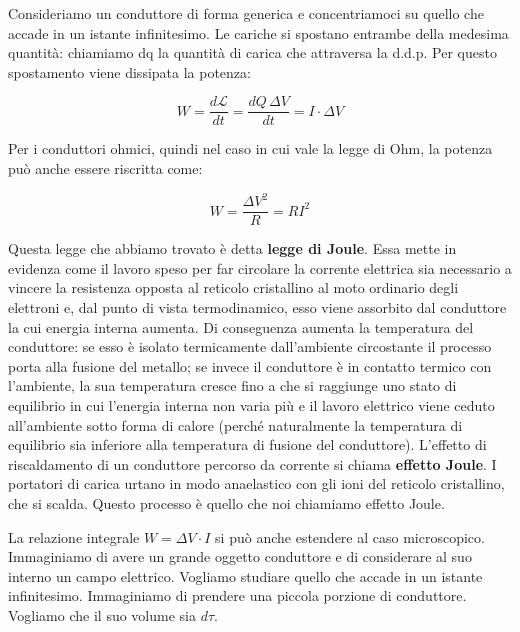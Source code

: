 Consideriamo un conduttore di forma generica e concentriamoci su quello che accade in un istante infinitesimo. Le cariche si spostano entrambe della medesima quantità: chiamiamo dq la quantità di carica che attraversa la d.d.p. Per questo spostamento viene dissipata la potenza:

\[
	\boxed{W=\frac{d\mathcal{L}}{dt} = \frac{dQ\,\Delta V}{dt} = I\cdot \Delta V}
\]

Per i conduttori ohmici, quindi nel caso in cui vale la legge di Ohm, la potenza può anche essere riscritta come:

\[
	W=\frac{\Delta V^2}{R} = RI^2
\]

Questa legge che abbiamo trovato è detta \textbf{legge di Joule}. Essa mette in evidenza come il lavoro speso per far circolare la corrente elettrica sia necessario a vincere la resistenza opposta al reticolo cristallino al moto ordinario degli elettroni e, dal punto di vista termodinamico, esso viene assorbito dal conduttore la cui energia interna aumenta. Di conseguenza aumenta la temperatura del conduttore: se esso è isolato termicamente dall'ambiente circostante il processo porta alla fusione del metallo; se invece il conduttore è in contatto termico con l'ambiente, la sua temperatura cresce fino a che si raggiunge uno stato di equilibrio in cui l'energia interna non varia più e il lavoro elettrico viene ceduto all'ambiente sotto forma di calore (perché naturalmente la temperatura di equilibrio sia inferiore alla temperatura di fusione del conduttore). L'effetto di riscaldamento di un conduttore percorso da corrente si chiama \textbf{effetto Joule}.
I portatori di carica urtano in modo anaelastico con gli ioni del reticolo cristallino, che si scalda. Questo processo è quello che noi chiamiamo effetto Joule.

La relazione integrale $ W=\Delta V\cdot I $ si può anche estendere al caso microscopico.
Immaginiamo di avere un grande oggetto conduttore e di considerare al suo interno un campo elettrico.
Vogliamo studiare quello che accade in un istante infinitesimo. Immaginiamo di prendere una piccola porzione di conduttore. Vogliamo che il suo volume sia $d\tau$.

